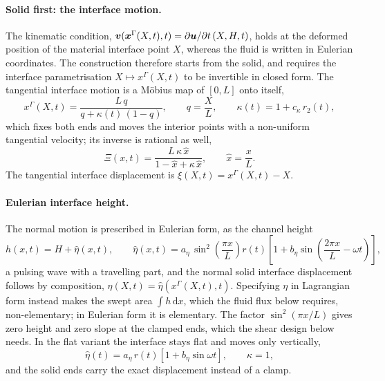 \paragraph{Solid first: the interface motion.}
The kinematic condition, $\boldsymbol{v}(\boldsymbol{x}^\Gamma(X,t),t) = \partial\boldsymbol{u}/\partial t\,(X,H,t)$, holds at the deformed position of the material interface point $X$, whereas the fluid is written in Eulerian coordinates.
The construction therefore starts from the solid, and requires the interface parametrisation $X \mapsto x^\Gamma(X,t)$ to be invertible in closed form.
The tangential interface motion is a M\"obius map of $[0,L]$ onto itself,
\begin{equation}
	x^\Gamma(X,t) = \frac{L\,q}{q + \kappa(t)\,(1-q)},
	\qquad q = \frac{X}{L},
	\qquad \kappa(t) = 1 + c_\kappa\,r_2(t),
\end{equation}
which fixes both ends and moves the interior points with a non-uniform tangential velocity; its inverse is rational as well,
\begin{equation}
	\Xi(x,t) = \frac{L\,\kappa\,\hat{x}}{1 - \hat{x} + \kappa\,\hat{x}},
	\qquad \hat{x} = \frac{x}{L}.
\end{equation}
The tangential interface displacement is $\xi(X,t) = x^\Gamma(X,t) - X$.

\paragraph{Eulerian interface height.}
The normal motion is prescribed in Eulerian form, as the channel height
\begin{equation}
	h(x,t) = H + \hat\eta(x,t),
	\qquad
	\hat\eta(x,t) = a_\eta\,\sin^2\!\left(\frac{\pi x}{L}\right) r(t) \left[1 + b_\eta \sin\!\left(\frac{2\pi x}{L} - \omega t\right)\right],
	\label{eq:mms_height}
\end{equation}
a pulsing wave with a travelling part, and the normal solid interface displacement follows by composition, $\eta(X,t) = \hat\eta(x^\Gamma(X,t),t)$.
Specifying $\eta$ in Lagrangian form instead makes the swept area $\int h\,\mathrm{d}x$, which the fluid flux below requires, non-elementary; in Eulerian form it is elementary.
The factor $\sin^2(\pi x/L)$ gives zero height and zero slope at the clamped ends, which the shear design below needs.
In the flat variant the interface stays flat and moves only vertically,
\begin{equation}
	\hat\eta(t) = a_\eta\,r(t)\left[1 + b_\eta \sin\omega t\right], \qquad \kappa = 1,
	\label{eq:mms_flat}
\end{equation}
and the solid ends carry the exact displacement instead of a clamp.

